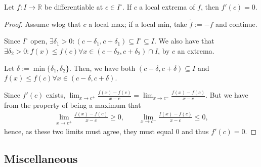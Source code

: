 \begin{lemma}
    Let $f : I \to \mathbb{R}$ be differentiable at $c \in I^\circ$. If $c$ a local extrema of $f$, then $f'(c) = 0$.
\end{lemma}
\begin{proof}
    Assume wlog that $c$ a local max; if a local min, take $\tilde f :=-f$ and continue.

    Since $I^\circ$ open, $\exists \delta_1 > 0 : (c- \delta_1, c + \delta_1) \subseteq I^\circ \subseteq I$. We also have that $\exists \delta_2 > 0 : f(x) \leq f(c) \forall x \in (c - \delta_2, c + \delta_2) \cap I$, by $c$ an extrema.

    Let $\delta := \min \{\delta_1, \delta_2\}$. Then, we have both $(c - \delta, c + \delta) \subseteq I$ and $f(x) \leq f(c) \forall x \in (c - \delta, c + \delta)$. 
    
    Since $f'(c)$ exists, $\lim_{x \to c^+} \frac{f(x) - f(c)}{x-c} = \lim_{x \to c^-} \frac{f(x) - f(c)}{x - c}$. But we have from the property of being a maximum that \begin{align*}
        \lim_{x \to c^+} \frac{f(x) - f(c)}{x-c} \geq 0, \qquad \lim_{x \to c^-} \frac{f(x) - f(c)}{x - c}\leq 0,
    \end{align*}
    hence, as these two limits must agree, they must equal $0$ and thus $f'(c) = 0$.
\end{proof}

\subsection{Miscellaneous}

